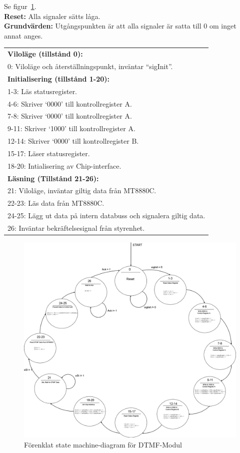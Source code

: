 \documentclass[a4paper,11pt]{article}
\begin{document}
			Se figur~\ref{fig:DTMFSM}.\\
			{\bf Reset:} Alla signaler sätts låga.\\
			{\bf Grundvärden:} Utgångspunkten är att alla signaler är satta till 0 om inget annat anges.\\
			\begin{tabular}{l}
				\\{\bf Viloläge (tillstånd 0):}\\
				0: Viloläge och återställningspunkt, inväntar ``sigInit''.\\
				{\bf Initialisering (tillstånd 1-20):}\\
				1-3: Läs statusregister.\\
				4-6: Skriver `0000' till kontrollregister A.\\
				7-8: Skriver `0000' till kontrollregister A.\\
				9-11: Skriver `1000' till kontrollregister A.\\
				12-14: Skriver `0000' till kontrollregister B.\\
				15-17: Läser statusregister.\\
				18-20: Intialisering av Chip-interface.\\
				{\bf Läsning (Tillstånd 21-26):}\\
				21:  Viloläge, inväntar giltig data från MT8880C.\\
				22-23:  Läs data från MT8880C.\\
				24-25:  Lägg ut data på intern databuss och signalera giltig data.\\
				26:  Inväntar bekräftelsesignal från styrenhet.\\				
			\end{tabular}

	\begin{figure}[H]
	  \centering
	      \includegraphics[scale=0.18, angle=0]{DTMFStateMachineDiagram.png}		
	  	\caption{Förenklat state machine-diagram för DTMF-Modul}
		\label{fig:DTMFSM}
	\end{figure}
	
\end{document}
